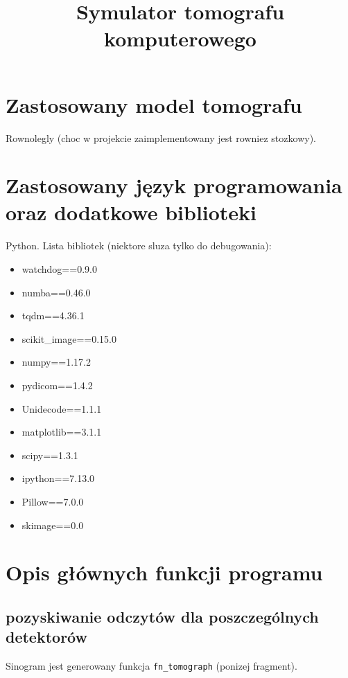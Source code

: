\documentclass{bmvc2k}
\title{Symulator tomografu komputerowego}
\begin{document}
\maketitle



\section{Zastosowany model tomografu}

Rownolegly (choc w projekcie zaimplementowany jest rowniez stozkowy).

\section{Zastosowany język programowania oraz dodatkowe biblioteki}

Python. Lista bibliotek (niektore sluza tylko do debugowania):

\begin{multicols}{3}
\begin{itemize}
\item watchdog==0.9.0
\item numba==0.46.0
\item tqdm==4.36.1
\item scikit\_image==0.15.0
\item numpy==1.17.2
\item pydicom==1.4.2
\item Unidecode==1.1.1
\item matplotlib==3.1.1
\item scipy==1.3.1
\item ipython==7.13.0
\item Pillow==7.0.0
\item skimage==0.0
\end{itemize}
\end{multicols}

\section{Opis głównych funkcji programu}

\subsection{pozyskiwanie odczytów dla poszczególnych detektorów}

Sinogram jest generowany funkcja {\tt fn\_tomograph} (ponizej fragment).
\end{document}
